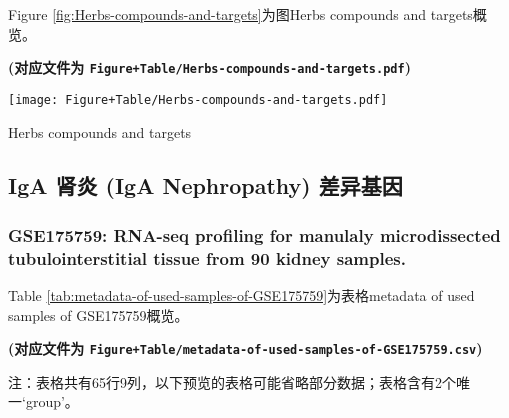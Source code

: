 \documentclass[
]{article}
\begin{document}
Figure \ref{fig:Herbs-compounds-and-targets}为图Herbs compounds and targets概览。

\textbf{(对应文件为 \texttt{Figure+Table/Herbs-compounds-and-targets.pdf})}

\def\@captype{figure}
\begin{center}
\texttt{[image: Figure+Table/Herbs-compounds-and-targets.pdf]}
\caption{Herbs compounds and targets}\label{fig:Herbs-compounds-and-targets}
\end{center}

\hypertarget{iga-ux80beux708e-iga-nephropathy-ux5deeux5f02ux57faux56e0}{%
\subsection{IgA 肾炎 (IgA Nephropathy) 差异基因}\label{iga-ux80beux708e-iga-nephropathy-ux5deeux5f02ux57faux56e0}}

\hypertarget{gse175759-rna-seq-profiling-for-manulaly-microdissected-tubulointerstitial-tissue-from-90-kidney-samples.}{%
\subsubsection{GSE175759: RNA-seq profiling for manulaly microdissected tubulointerstitial tissue from 90 kidney samples.}\label{gse175759-rna-seq-profiling-for-manulaly-microdissected-tubulointerstitial-tissue-from-90-kidney-samples.}}

Table \ref{tab:metadata-of-used-samples-of-GSE175759}为表格metadata of used samples of GSE175759概览。

\textbf{(对应文件为 \texttt{Figure+Table/metadata-of-used-samples-of-GSE175759.csv})}

\begin{center}\begin{tcolorbox}[colback=gray!10, colframe=gray!50, width=0.9\linewidth, arc=1mm, boxrule=0.5pt]注：表格共有65行9列，以下预览的表格可能省略部分数据；表格含有2个唯一`group'。
\end{tcolorbox}
\end{center}
\end{document}
